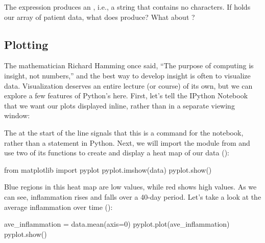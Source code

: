 \begin{challenge}
  The expression  produces an
  , i.e., a string that contains
  no characters. If  holds our array of patient data, what
  does  produce? What about
  ?
\end{challenge}

\subsection{Plotting}

The mathematician Richard Hamming once said, ``The purpose of computing
is insight, not numbers,'' and the best way to develop insight is often
to visualize data. Visualization deserves an entire lecture (or course)
of its own, but we can explore a few features of Python's
 here. First, let's tell the IPython Notebook that we
want our plots displayed inline, rather than in a separate viewing
window:

\begin{VerbIn}
\end{VerbIn}

The \code{\%} at the start of the line signals that this is a
command for the notebook, rather than a statement in Python. Next, we
will import the  module from  and
use two of its functions to create and display a heat map of our data
():

\begin{VerbIn}
from matplotlib import pyplot
pyplot.imshow(data)
pyplot.show()
\end{VerbIn}


Blue regions in this heat map are low values, while red shows high
values. As we can see, inflammation rises and falls over a 40-day
period. Let's take a look at the average inflammation over time ():

\begin{VerbIn}
ave_inflammation = data.mean(axis=0)
pyplot.plot(ave_inflammation)
pyplot.show()
\end{VerbIn}


